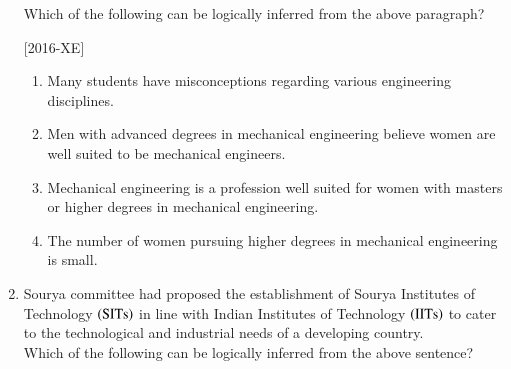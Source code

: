\documentclass[journal]{IEEEtran}
\begin{document}
\begin{enumerate}
Which of the following can be logically inferred from the above paragraph? 

    \hfill{[2016-XE]}
\begin{enumerate}
    \item Many students have misconceptions regarding various engineering disciplines.\\
    \item Men with advanced degrees in mechanical engineering believe women are well suited to be mechanical engineers.\\
    \item Mechanical engineering is a profession well suited for women with masters or higher degrees in mechanical engineering.\\
    \item The number of women pursuing higher degrees in mechanical engineering is small.
\end{enumerate}
\item Sourya committee had proposed the establishment of Sourya Institutes of Technology $\left(\text{SITs}\right)$ in line with Indian Institutes of Technology $\left(\text{IITs}\right)$ to cater to the technological and industrial needs of a developing country.\\

Which of the following can be logically inferred from the above sentence?\\


\end{enumerate}
\end{document}
